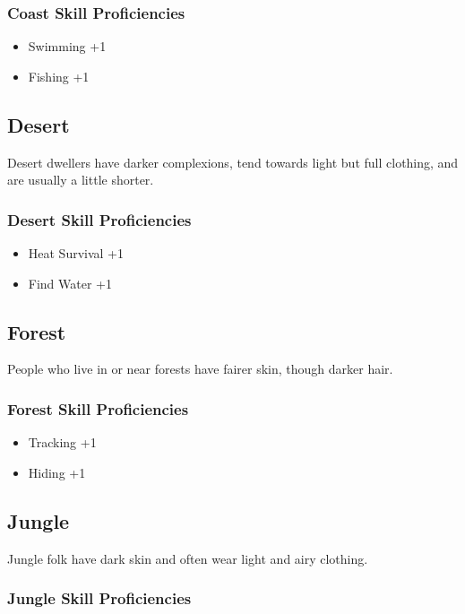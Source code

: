 \begin{multicols}{2}
\subsubsection{Coast Skill Proficiencies}

\begin{itemize}
    \item Swimming +1
    \item Fishing +1
\end{itemize}

\subsection{Desert}

Desert dwellers have darker complexions, tend towards light but full
clothing, and are usually a little shorter.

\subsubsection{Desert Skill Proficiencies}

\begin{itemize}
    \item Heat Survival +1
    \item Find Water +1
\end{itemize}

\subsection{Forest}

People who live in or near forests have fairer skin, though darker
hair.

\subsubsection{Forest Skill Proficiencies}

\begin{itemize}
    \item Tracking +1
    \item Hiding +1
\end{itemize}

\subsection{Jungle}

Jungle folk have dark skin and often wear light and airy clothing.

\subsubsection{Jungle Skill Proficiencies}


\end{multicols}
